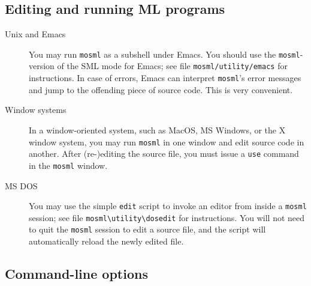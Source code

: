 \documentclass[fleqn]{article}
\begin{document}
\subsection{Editing and running ML programs}
\label{sec-editing}
\begin{description}
\item[Unix and Emacs] You may run {\tt mosml} as a subshell under
  Emacs.  You should use the {\tt mosml}-version of the SML mode for
  Emacs; see file {\tt mosml/utility/emacs} for instructions.  In case
  of errors, Emacs can interpret {\tt mosml}'s error messages and jump
  to the offending piece of source code.  This is very convenient.

\item[Window systems] In a window-oriented system, such as MacOS, MS
  Windows, or the X window system, you may run {\tt mosml} in one
  window and edit source code in another.  After (re-)editing the
  source file, you must issue a {\tt use} command in the {\tt mosml}
  window.

\item[MS DOS] You may use the simple {\tt edit} script to invoke an
  editor from inside a {\tt mosml} session; see file
  \verb#mosml\utility\dosedit# for instructions.  You will not need to
  quit the {\tt mosml} session to edit a source file, and the script
  will automatically reload the newly edited file.
\end{description}

\subsection{Command-line options}
\label{sec-mosml-options}
\end{document}

